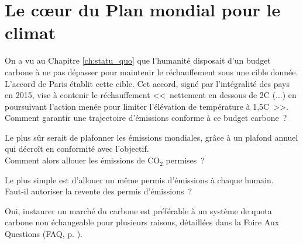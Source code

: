 \documentclass[a5paper,french,openany]{memoir}
\begin{document}



\chapter{Le cœur du Plan mondial pour le climat\label{ch:coeur}}


On a vu au Chapitre \ref{ch:statu_quo} que l'humanité disposait d'un budget carbone à ne pas dépasser pour maintenir le réchauffement sous une cible donnée. L'accord de Paris établit cette cible. Cet accord, signé par l'intégralité des pays en 2015,  vise à contenir le réchauffement <<~nettement en dessous de 2\textdegree{}C (...) en poursuivant l'action menée pour limiter l'élévation de température à 1,5\textdegree{}C~>>. \\

Comment garantir une trajectoire d'émissions conforme à ce budget carbone~? 

Le plus sûr serait de plafonner les émissions mondiales, grâce à un plafond annuel qui décroît en conformité avec l'objectif. \\

Comment alors allouer les émissions de CO$_\text{2}$ permises~? 

Le plus simple %
est d'allouer un même permis d'émissions à chaque humain. \\

Faut-il autoriser la revente des permis d'émissions~? 

Oui, %
instaurer un marché du carbone est préférable à un système de quota carbone non échangeable pour plusieurs raisons, détaillées dans la Foire Aux Questions (FAQ, p. \pageref{q:rationnement}).\\ %
\end{document}
